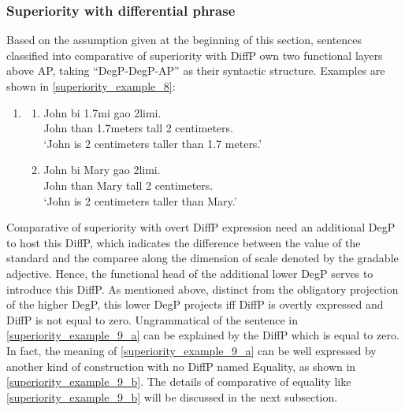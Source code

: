 \documentclass{ctexart}
\begin{document}
\subsubsection{Superiority with differential phrase}

Based on the assumption given at the beginning of this section, sentences classified into comparative of superiority with DiffP own two functional layers above AP, taking ``DegP-DegP-AP'' as their syntactic structure. Examples are shown in \ref{superiority_example_8}:

\begin{enumerate}
    \item \label{superiority_example_8}
    \begin{enumerate}
        \item \label{superiority_example_8_a}
        John bi 1.7mi gao 2limi. \\
        John than 1.7meters tall 2 centimeters. \\
        `John is 2 centimeters taller than 1.7 meters.'

        \item \label{superiority_example_8_b}
        John bi Mary gao 2limi. \\
        John than Mary tall 2 centimeters.  \\
        `John is 2 centimeters taller than Mary.'

    \end{enumerate}
\end{enumerate}

Comparative of superiority with overt DiffP expression need an additional DegP to host this DiffP, which indicates the difference between the value of the standard and the comparee along the dimension of scale denoted by the gradable adjective. Hence, the functional head of the additional lower DegP serves to introduce this DiffP. As mentioned above, distinct from the obligatory projection of the higher DegP, this lower DegP projects iff DiffP is overtly expressed and DiffP is not equal to zero. Ungrammatical of the sentence in \ref{superiority_example_9_a} can be explained by the DiffP which is equal to zero. In fact, the meaning of \ref{superiority_example_9_a} can be well expressed by another kind of construction with no DiffP named Equality, as shown in \ref{superiority_example_9_b}. The details of comparative of equality like \ref{superiority_example_9_b} will be discussed in the next subsection.
\end{document}
